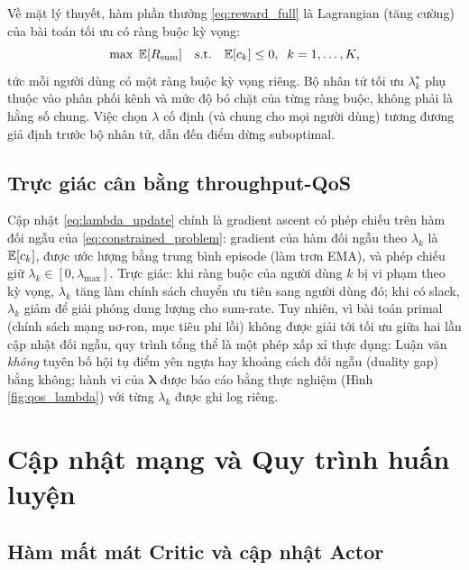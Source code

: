 Về mặt lý thuyết, hàm phần thưởng
\eqref{eq:reward_full} là Lagrangian (tăng cường) của bài toán tối ưu
có ràng buộc kỳ vọng:
\begin{equation}
\max\;\mathbb{E}[R_{\text{sum}}] \quad \text{s.t.}\quad
\mathbb{E}[c_k] \leq 0,\;\; k = 1, \ldots, K,
\label{eq:constrained_problem}
\end{equation}
tức mỗi người dùng có một ràng buộc kỳ vọng riêng. Bộ nhân tử tối ưu
$\lambda_k^\star$ phụ thuộc vào phân phối kênh và mức độ bó chặt của
từng ràng buộc, không phải là hằng số chung. Việc chọn $\lambda$ cố
định (và chung cho mọi người dùng) tương đương giả định trước bộ nhân
tử, dẫn đến điểm dừng suboptimal.

\subsection{Trực giác cân bằng throughput-QoS}
\label{sec:tradeoff_intuition}

Cập nhật \eqref{eq:lambda_update} chính là gradient ascent có phép
chiếu trên hàm đối ngẫu của \eqref{eq:constrained_problem}: gradient
của hàm đối ngẫu theo $\lambda_k$ là $\mathbb{E}[c_k]$, được ước lượng bằng
trung bình episode (làm trơn EMA), và phép chiếu giữ
$\lambda_k \in [0, \lambda_{\max}]$. Trực giác: khi ràng buộc của người
dùng $k$ bị vi phạm theo kỳ vọng, $\lambda_k$ tăng làm chính sách
chuyển ưu tiên sang người dùng đó; khi có slack, $\lambda_k$ giảm để
giải phóng dung lượng cho sum-rate. Tuy nhiên, vì bài toán primal
(chính sách mạng nơ-ron, mục tiêu phi lồi) không được giải tới tối ưu
giữa hai lần cập nhật đối ngẫu, quy trình tổng thể là một phép xấp xỉ
thực dụng: Luận văn \emph{không} tuyên bố hội tụ điểm yên ngựa hay
khoảng cách đối ngẫu (duality gap) bằng không; hành vi của
$\boldsymbol{\lambda}$ được báo cáo bằng thực nghiệm (Hình
\ref{fig:qos_lambda}) với từng $\lambda_k$ được ghi log riêng.

\section{Cập nhật mạng và Quy trình huấn luyện}
\label{sec:training}

\subsection{Hàm mất mát Critic và cập nhật Actor}


